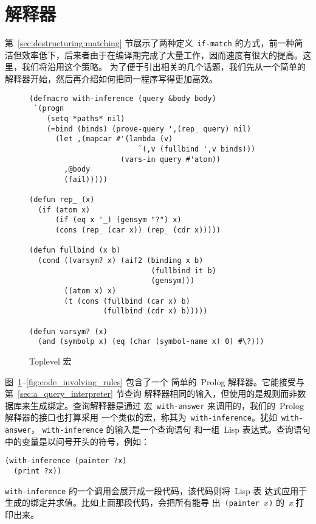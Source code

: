 \section{解释器}
\label{sec:prolog:an_interpreter}
第~\ref{sec:destructuring:matching} 节展示了两种定义~\texttt{if-match}
的方式，前一种简洁但效率低下，后来者由于在编译期完成了大量工作，因而速度有很大的提高。这里，我们将沿用这个策略。
为了便于引出相关的几个话题，我们先从一个简单的解释器开始，然后再介绍如何把同一程序写得更加高效。

\begin{figure}
\begin{lstlisting}
(defmacro with-inference (query &body body)
 `(progn
    (setq *paths* nil)
    (=bind (binds) (prove-query ',(rep_ query) nil)
      (let ,(mapcar #'(lambda (v)
                         `(,v (fullbind ',v binds)))
                     (vars-in query #'atom))
        ,@body
        (fail)))))

(defun rep_ (x)
  (if (atom x)
      (if (eq x '_) (gensym "?") x)
      (cons (rep_ (car x)) (rep_ (cdr x)))))

(defun fullbind (x b)
  (cond ((varsym? x) (aif2 (binding x b)
                            (fullbind it b)
                            (gensym)))
        ((atom x) x)
        (t (cons (fullbind (car x) b)
                 (fullbind (cdr x) b)))))

(defun varsym? (x)
  (and (symbolp x) (eq (char (symbol-name x) 0) #\?)))

\end{lstlisting}
  \caption{Toplevel 宏}
  \label{fig:prolog:toplevel_macro}
\end{figure}

图~\ref{fig:prolog:toplevel_macro}--\ref{fig:code_involving_rules} 包含了一个
简单的~Prolog 解释器。它能接受与第~\ref{sec:a_query_interpreter} 节查询
解释器相同的输入，但使用的是规则而非数据库来生成绑定。查询解释器是通过
宏~\texttt{with-answer} 来调用的，我们的~Prolog 解释器的接口也打算采用
一个类似的宏，称其为~\texttt{with-inference}。犹如~\texttt{with-answer}，
\texttt{with-inference} 的输入是一个查询语句
和一组~Lisp 表达式。查询语句中的变量是以问号开头的符号，例如：
\begin{lstlisting}
(with-inference (painter ?x)
  (print ?x))
\end{lstlisting}
\texttt{with-inference} 的一个调用会展开成一段代码，该代码则将~Lisp 表
达式应用于生成的绑定并求值。比如上面那段代码，会把所有能导
出~\texttt{(painter $x$)} 的~\emph{x} 打印出来。


